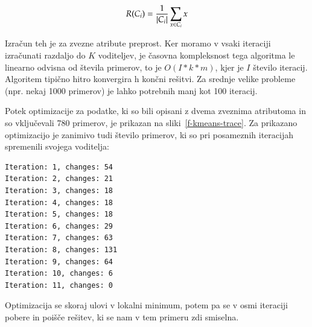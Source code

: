 $$ R(C_i) = {1\over |C_i|} \sum_{x\in C_i}x $$

Izračun teh je za zvezne atribute preprost. Ker moramo v vsaki iteraciji izračunati razdaljo do $K$ voditeljev, je časovna kompleksnost tega algoritma le linearno odvisna od števila primerov, to je $O(I*k*m)$, kjer je $I$ število iteracij. Algoritem tipično hitro konvergira h končni rešitvi. Za srednje velike probleme (npr. nekaj 1000 primerov) je lahko potrebnih manj kot 100 iteracij.

Potek optimizacije za podatke, ki so bili opisani z dvema zveznima atributoma in so vključevali 780 primerov, je prikazan na sliki~\ref{f-kmeans-trace}. Za prikazano optimizacijo je zanimivo tudi število primerov, ki so pri posameznih iteracijah spremenili svojega voditelja:
%
\begin{verbatim}
Iteration: 1, changes: 54
Iteration: 2, changes: 21
Iteration: 3, changes: 18
Iteration: 4, changes: 18
Iteration: 5, changes: 18
Iteration: 6, changes: 29
Iteration: 7, changes: 63
Iteration: 8, changes: 131
Iteration: 9, changes: 64
Iteration: 10, changes: 6
Iteration: 11, changes: 0
\end{verbatim}
%
Optimizacija se skoraj ulovi v lokalni minimum, potem pa se v osmi
iteraciji pobere in poišče rešitev, ki se nam v tem primeru zdi smiselna.


